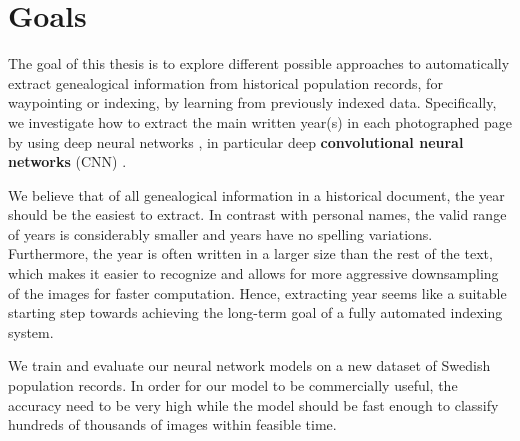 \section{Goals}

The goal of this thesis is to explore different possible approaches to automatically extract genealogical information from historical population records, for waypointing or indexing, by learning from previously indexed data. Specifically, we investigate how to extract the main written year(s) in each photographed page by using deep neural networks
, in particular deep \textbf{convolutional neural networks} (CNN)
.

We believe that of all genealogical information in a historical document, the year should be the easiest to extract.
In contrast with personal names, the valid range of years is considerably smaller and years have no spelling variations. Furthermore, the year is often written in a larger size than the rest of the text, which makes it easier to recognize and allows for more aggressive downsampling of the images for faster computation.
Hence, extracting year seems like a suitable starting step towards achieving the long-term goal of a fully automated indexing system.



We train and evaluate our neural network models on a new dataset of Swedish population records.
In order for our model to be commercially useful, the accuracy need to be very high while the model should be fast enough to classify hundreds of thousands of images within feasible time.


